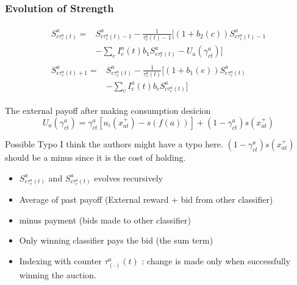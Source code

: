 \begin{frame}[allowframebreaks]
    \frametitle{Evolution of Strength}

    \newcommand{\Setau}{S^a_{e \tau^a_e(t)}}
    \newcommand{\Setauf}{S^a_{e \tau^a_e(t)+1}}
    \newcommand{\Sctau}{S^a_{c \tau^a_c(t)}}
    \newcommand{\Sctaul}{S^a_{c \tau^a_c(t)-1}}
    \newcommand{\gct}{\gamma^a_{ct}}

    \begin{align}
        \begin{split}
            \Sctau =& \Sctaul - \frac{1}{\tau^a_c(t) - 1} \Biggl[
                (1+b_2(c))\Sctaul \\
                &- \sum_e I^a_e(t)b_1\Setau - U_a(\gamma^a_{ct})
            \Biggl]
        \end{split} \\[2em]
        \begin{split}
            \Setauf =& \Setau - \frac{1}{\tau^a_e(t)} \Biggl[
                (1+b_1(e))\Setau \\
                &- \sum_c I^a_c(t)b_c \Sctau 
            \Biggl]
        \end{split}
    \end{align}
    
    The external payoff after making consumption desicion
    \begin{equation}
        U_a(\gct) = \gct\left[u_i(x_{at}^+) - s(f(a))\right] + (1-\gct)s(x_{at}^+)
    \end{equation}
    \begin{alertblock}{Possible Typo}
        I think the authors might have a typo here. $(1-\gct)s(x_{at}^+)$ 
        should be a minus since it is the cost of holding.
    \end{alertblock}
    \framebreak

    \begin{itemize}
        \item $\Setau$ and $\Sctau$ evolves recursively
        \item Average of past payoff (External reward + bid from other classifier)
        \item minus payment (bids made to other classifier)
        \item Only winning classifier pays the bid (the sum term)
        \item Indexing with counter $\tau_{(\cdot)}^a(t)$ : change is made only when successfully winning the auction.
    \end{itemize}
\end{frame}

